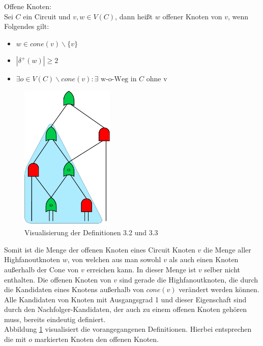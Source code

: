 \documentclass[11pt, a4paper, german]{article}
\begin{document}
\begin{definition}{Offene Knoten:}\\
	Sei $C$ ein Circuit und $v,w \in V(C)$, dann heißt $w$ offener Knoten von $v$, wenn Folgendes gilt: 
	\begin{itemize}
		\item $ w \in cone(v)\backslash \{ v \} $
		\item $| \delta ^{+}(w)| \geq 2$
		\item $ \exists o \in V(C) \backslash cone(v) : \exists \text{ w-o-Weg in } C \text{ ohne v} $
	\end{itemize}	
\end{definition}
 \begin{figure}
		\includegraphics[height = 7cm]{pictures/compiled/cone}
		\caption{Visualisierung der Definitionen 3.2 und 3.3}
		\label{bild:cone}
\end{figure}
Somit ist die Menge der offenen Knoten eines Circuit Knoten $v$ die Menge aller Highfanoutknoten $w$, von welchen aus man sowohl $v$ als auch einen Knoten außerhalb der Cone von $v$ erreichen kann. In dieser Menge ist $v$ selber nicht enthalten. Die offenen Knoten von $v$ sind gerade die Highfanoutknoten, die durch die Kandidaten eines Knotens außerhalb von $cone(v)$ verändert werden können. Alle Kandidaten von  Knoten mit Ausgangsgrad 1 und dieser Eigenschaft sind durch den Nachfolger-Kandidaten, der auch zu einem offenen Knoten gehören muss, bereits eindeutig definiert. \\
Abbildung \ref{bild:cone} visualisiert die vorangegangenen Definitionen. Hierbei entsprechen die  mit $o$ markierten Knoten den offenen Knoten.
\end{document}
